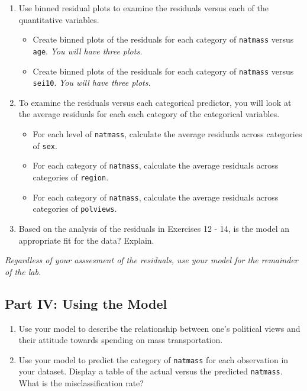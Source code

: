 \documentclass[]{book}
\providecommand{\tightlist}{%
  \setlength{\itemsep}{0pt}\setlength{\parskip}{0pt}}
\begin{document}
\begin{enumerate}
\def\labelenumi{\arabic{enumi}.}
\setcounter{enumi}{12}
\item
  Use binned residual plots to examine the residuals versus each of the
  quantitative variables.

  \begin{itemize}
  \tightlist
  \item
    Create binned plots of the residuals for each category of
    \texttt{natmass} versus \texttt{age}. \emph{You will have three
    plots.}
  \item
    Create binned plots of the residuals for each category of
    \texttt{natmass} versus \texttt{sei10}. \emph{You will have three
    plots.}
  \end{itemize}
\item
  To examine the residuals versus each categorical predictor, you will
  look at the average residuals for each each category of the
  categorical variables.

  \begin{itemize}
  \tightlist
  \item
    For each level of \texttt{natmass}, calculate the average residuals
    across categories of \texttt{sex}.
  \item
    For each category of \texttt{natmass}, calculate the average
    residuals across categories of \texttt{region}.
  \item
    For each category of \texttt{natmass}, calculate the average
    residuals across categories of \texttt{polviews}.
  \end{itemize}
\item
  Based on the analysis of the residuals in Exercises 12 - 14, is the
  model an appropriate fit for the data? Explain.
\end{enumerate}

\emph{Regardless of your asssesment of the residuals, use your model for
the remainder of the lab.}

\subsection{Part IV: Using the Model}\label{part-iv-using-the-model}

\begin{enumerate}
\def\labelenumi{\arabic{enumi}.}
\setcounter{enumi}{15}
\item
  Use your model to describe the relationship between one's political
  views and their attitude towards spending on mass transportation.
\item
  Use your model to predict the category of \texttt{natmass} for each
  observation in your dataset. Display a table of the actual versus the
  predicted \texttt{natmass}. What is the misclassification rate?
\end{enumerate}
\end{document}
